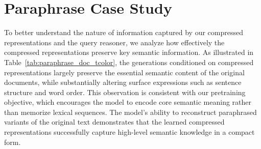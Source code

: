 \documentclass{applemlr}
\numberwithin{equation}{section}
\begin{document}
\section{Paraphrase Case Study}
To better understand the nature of information captured by our compressed representations and the query reasoner, we analyze how effectively the compressed representations preserve key semantic information. 
As illustrated in Table~\ref{tab:paraphrase_doc_tcolor}, 
the generations conditioned on compressed representations largely preserve the essential semantic content of the original documents, 
while substantially altering surface expressions such as sentence structure and word order. 
This observation is consistent with our pretraining objective, 
which encourages the model to encode core semantic meaning rather than memorize lexical sequences. 
The model’s ability to reconstruct paraphrased variants of the original text demonstrates that 
the learned compressed representations successfully capture high-level semantic knowledge in a compact form.
\end{document}
